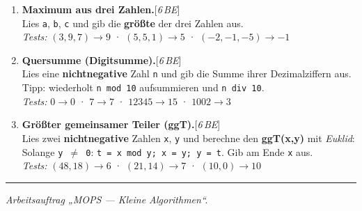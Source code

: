 \documentclass[11pt,a4paper]{scrartcl}
\newenvironment{aufgaben}{%
  \begin{enumerate}[leftmargin=*,label=\textbf{Aufgabe~\arabic*:}, itemsep=0.6em]
  }{\end{enumerate}}
\newcommand{\punkte}[1]{\hfill{\small[\textit{#1\,BE}]}}%
\begin{document}
  \begin{aufgaben}

    \item \textbf{Maximum aus drei Zahlen.}\punkte{6}\\
    Lies \texttt{a}, \texttt{b}, \texttt{c} und gib die \textbf{größte} der drei Zahlen aus.\\
    \emph{Tests:} $(3,9,7)\to 9$ \;·\; $(5,5,1)\to 5$ \;·\; $(-2,-1,-5)\to -1$

    \item \textbf{Quersumme (Digitsumme).}\punkte{6}\\
    Lies eine \textbf{nichtnegative} Zahl \texttt{n} und gib die Summe ihrer Dezimalziffern aus. Tipp: wiederholt \texttt{n mod 10} aufsummieren und \texttt{n div 10}.\\
    \emph{Tests:} $0\to 0$ \;·\; $7\to 7$ \;·\; $12345\to 15$ \;·\; $1002\to 3$

    \item \textbf{Größter gemeinsamer Teiler (ggT).}\punkte{6}\\
    Lies zwei \textbf{nichtnegative} Zahlen \texttt{x}, \texttt{y} und berechne den \textbf{ggT(x,y)} mit \emph{Euklid}: Solange \texttt{y $\neq$ 0}: \texttt{t = x mod y; x = y; y = t}. Gib am Ende \texttt{x} aus.\\
    \emph{Tests:} $(48,18)\to 6$ \;·\; $(21,14)\to 7$ \;·\; $(10,0)\to 10$

  \end{aufgaben}

  \vfill
  \hrule
  \small\emph{Arbeitsauftrag „MOPS — Kleine Algorithmen“.}
\end{document}
